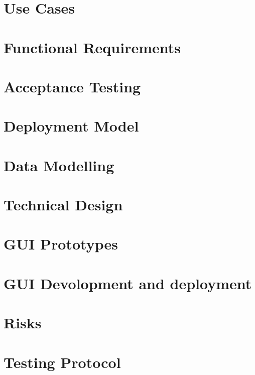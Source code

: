 \documentclass{article}
\begin{document}
	\section{Use Cases}
	
	\pagebreak
	
	\section{Functional Requirements}
	
	\pagebreak
	
	\section{Acceptance Testing}
	
	\pagebreak
	
	\section{Deployment Model}
	
	\pagebreak
	
	\section{Data Modelling}
	
	\pagebreak
	
	\section{Technical Design}
	
	\pagebreak
	
	\section{GUI Prototypes}
	
	
	\section{GUI Devolopment and deployment}
	
	\pagebreak
	
	\section{Risks}
	
	\pagebreak
	
	\section{Testing Protocol}
	
	\pagebreak
	
\end{document}
